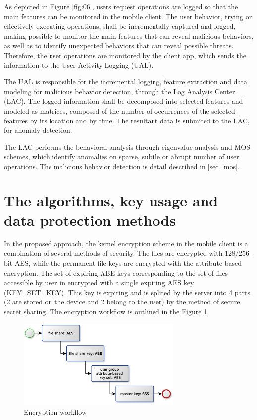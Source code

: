 \documentclass[twocolumn]{svjour3}          	%
\begin{document}
As depicted in Figure \ref{fig:06}, users request operations are logged so that the main features can be monitored in the mobile client. The user behavior, trying or effectively executing operations, shall be incrementally captured and logged, making possible to monitor the main features that can reveal malicious behaviors, as well as to identify unexpected behaviors that can reveal possible threats. Therefore, the user operations are monitored by the client app, which sends the information to the User Activity Logging (UAL). 

The UAL is responsible for the incremental logging, feature extraction and data modeling for malicious behavior detection, through the Log Analysis Center (LAC). The logged information shall be decomposed into selected features and modeled as matrices, composed of the number of occurrences of the selected features by its location and by time. The resultant data is submited to the LAC, for anomaly detection.

The LAC performs the behavioral analysis through eigenvalue analysis and MOS schemes, which identify anomalies on sparse, subtle or abrupt number of user operations. The malicious behavior detection is detail described in \ref{sec_mos}.

\section{The algorithms, key usage and data protection methods}
\label{sec_algorithms}
In the proposed approach, the kernel encryption scheme in the mobile client is a combination of several methods of security. The files are encrypted with 128/256-bit AES, while the permanent file keys are encrypted with the attribute-based encryption. The set of expiring ABE keys corresponding to the set of files accessible by user in encrypted with a single expiring AES key (KEY\_SET\_KEY). This key is expiring and is splited by the server into 4 parts (2 are stored on the device and 2 belong to the user) by the method of secure secret sharing. The encryption workflow is outlined in the Figure \ref{fig:07}.

\begin{figure}[h!]
	\centering
	\includegraphics[width=8cm]{fig07.eps}
	\caption{Encryption workflow}
	\label{fig:07}
\end{figure}
\end{document}
